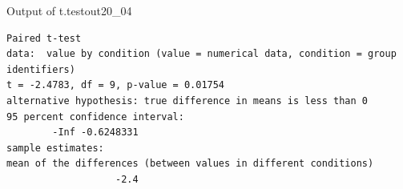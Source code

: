 \begin{Rscreen}{Output of t.test}{out20_04}
	\begin{verbatim}
Paired t-test
data:  value by condition (value = numerical data, condition = group identifiers)
t = -2.4783, df = 9, p-value = 0.01754
alternative hypothesis: true difference in means is less than 0
95 percent confidence interval:
        -Inf -0.6248331
sample estimates:
mean of the differences (between values in different conditions)
                   -2.4 
\end{verbatim}
\end{Rscreen}
